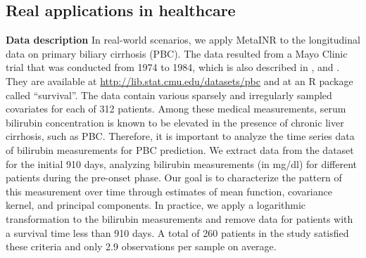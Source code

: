 \documentclass{article}
\begin{document}




\subsection{Real applications in healthcare}
\textbf{Data description} 
In real-world scenarios, we apply MetaINR to the longitudinal data on primary biliary cirrhosis (PBC).
The data resulted from a Mayo Clinic trial that was conducted from 1974 to 1984, 
which is also described in \cite{markus1989efficacy}, \cite{fleming2013counting} and \cite{murtaugh1994primary}. 
They are available at \url{http://lib.stat.cmu.edu/datasets/pbc} and at an R package called ``survival''.
The data contain various sparsely and irregularly sampled covariates for each of 312 patients. 
Among these medical measurements,
serum bilirubin concentration is known to be elevated in the presence of chronic liver cirrhosis, such as PBC.
Therefore, it is important to analyze the time series data of bilirubin measurements for PBC prediction.
We extract data from the dataset for the initial 910 days, 
analyzing bilirubin measurements (in mg/dl) for different patients 
during the pre-onset phase. 
Our goal is to characterize the pattern of this measurement over time through estimates of mean function, covariance kernel, and principal components.
In practice, we apply a logarithmic transformation to the bilirubin measurements and remove data for patients with a survival time less than 910 days.
A total of 260 patients in the study satisfied these criteria and only 2.9 observations per sample on average. 
\end{document}

